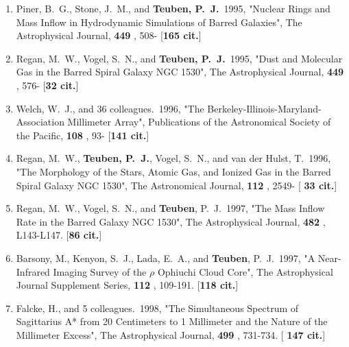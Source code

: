 \documentclass[11pt,letterpaper]{article}
\begin{document}
\begin{enumerate}[label=\textbf{\arabic*}.]

\item  
Piner, B.~G., Stone, J.~M., and {\bf Teuben, P.~J.}\  1995,  "Nuclear Rings and 
Mass Inflow in Hydrodynamic Simulations of Barred Galaxies", The 
Astrophysical Journal,  {\bf 449} , 508- [{\bf 165 cit.}] 

\item  
Regan, M.~W., Vogel, S.~N., and {\bf Teuben, P.~J.}\  1995,  "Dust and Molecular 
Gas in the Barred Spiral Galaxy NGC 1530", The Astrophysical Journal,  {\bf 
449} , 576- [{\bf 32 cit.}] 


\item  
Welch, W.~J., and 36 colleagues.\  1996,  "The 
Berkeley-Illinois-Maryland-Association Millimeter Array", Publications of 
the Astronomical Society of the Pacific,  {\bf 108} , 93- [{\bf 141 cit.}] 

\item  
Regan, M.~W., {\bf Teuben, P.~J.}, Vogel, S.~N., and van der Hulst, T.\  1996,  
"The Morphology of the Stars, Atomic Gas, and Ionized Gas in the Barred 
Spiral Galaxy NGC 1530", The Astronomical Journal,  {\bf 112} , 2549- [{\bf 
33 cit.}] 

\item  
Regan, M.~W., Vogel, S.~N., and {\bf Teuben}, P.~J.\  1997,  "The Mass Inflow 
Rate in the Barred Galaxy NGC 1530", The Astrophysical Journal,  {\bf 482} 
, L143-L147.  [{\bf 86 cit.}] 


\item  
Barsony, M., Kenyon, S.~J., Lada, E.~A., and {\bf Teuben}, P.~J.\  1997,  "A 
Near-Infrared Imaging Survey of the {$\rho$} Ophiuchi Cloud Core", The 
Astrophysical Journal Supplement Series,  {\bf 112} , 109-191.  [{\bf 118 
cit.}] 

\item  
Falcke, H., and 5 colleagues.\  1998,  "The Simultaneous Spectrum of 
Sagittarius A* from 20 Centimeters to 1 Millimeter and the Nature of the 
Millimeter Excess", The Astrophysical Journal,  {\bf 499} , 731-734.  [{\bf 
147 cit.}] 



\end{enumerate}
\end{document}
